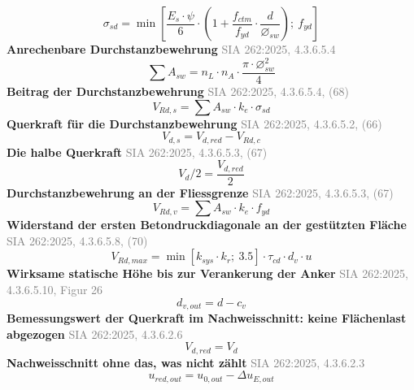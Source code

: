 \documentclass[11pt,a4paper]{article}
\newcommand{\normref}[1]{{\small\textcolor{gray}{#1}}}
\begin{document}
\begin{equation*}
\sigma_{sd} = \min\left[\frac{E_{s} \cdot \psi}{6} \cdot \left(1 + \frac{f_{ctm}}{f_{yd}} \cdot \frac{d}{\varnothing_{sw}}\right);\ f_{yd}\right]
\end{equation*}
\noindent\textbf{Anrechenbare Durchstanzbewehrung} \hfill \normref{SIA 262:2025, 4.3.6.5.4}
\begin{equation*}
\sum A_{sw} = n_L \cdot n_A \cdot \frac{\pi \cdot \varnothing_{sw}^{2}}{4}
\end{equation*}
\noindent\textbf{Beitrag der Durchstanzbewehrung} \hfill \normref{SIA 262:2025, 4.3.6.5.4, (68)}
\begin{equation*}
V_{Rd,s} = \sum A_{sw} \cdot k_e \cdot \sigma_{sd}
\end{equation*}
\noindent\textbf{Querkraft für die Durchstanzbewehrung} \hfill \normref{SIA 262:2025, 4.3.6.5.2, (66)}
\begin{equation*}
V_{d,s} = V_{d,red} - V_{Rd,c}
\end{equation*}
\noindent\textbf{Die halbe Querkraft} \hfill \normref{SIA 262:2025, 4.3.6.5.3, (67)}
\begin{equation*}
V_d / 2 = \frac{V_{d,red}}{2}
\end{equation*}
\noindent\textbf{Durchstanzbewehrung an der Fliessgrenze} \hfill \normref{SIA 262:2025, 4.3.6.5.3, (67)}
\begin{equation*}
V_{Rd,v} = \sum A_{sw} \cdot k_e \cdot f_{yd}
\end{equation*}
\noindent\textbf{Widerstand der ersten Betondruckdiagonale an der gestützten Fläche} \hfill \normref{SIA 262:2025, 4.3.6.5.8, (70)}
\begin{equation*}
V_{Rd,max} = \min\left[k_{sys} \cdot k_r;\ 3.5\right] \cdot \tau_{cd} \cdot d_v \cdot u
\end{equation*}
\noindent\textbf{Wirksame statische Höhe bis zur Verankerung der Anker} \hfill \normref{SIA 262:2025, 4.3.6.5.10, Figur 26}
\begin{equation*}
d_{v,out} = d - c_v
\end{equation*}
\noindent\textbf{Bemessungswert der Querkraft im Nachweisschnitt: keine Flächenlast abgezogen} \hfill \normref{SIA 262:2025, 4.3.6.2.6}
\begin{equation*}
V_{d,red} = V_d
\end{equation*}
\noindent\textbf{Nachweisschnitt ohne das, was nicht zählt} \hfill \normref{SIA 262:2025, 4.3.6.2.3}
\begin{equation*}
u_{red,out} = u_{0,out} - \Delta u_{E,out}
\end{equation*}
\end{document}
